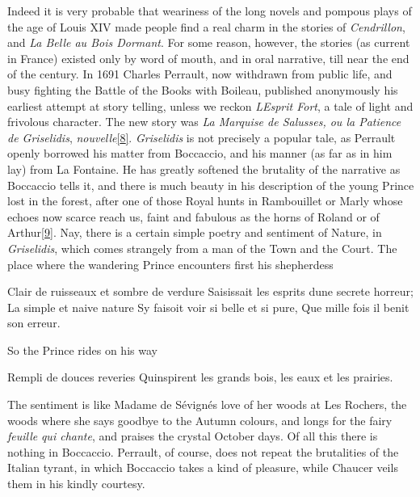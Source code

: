 \documentclass[14pt,a4paper]{memoir}
\begin{document}
Indeed it is very probable that weariness of the long novels and pompous
plays of the age of Louis XIV made people find a real charm in the
stories of \emph{Cendrillon}, and \emph{La Belle au Bois Dormant}. For
some reason, however, the stories (as current in France) existed only by
word of mouth, and in oral narrative, till near the end of the century.
In 1691 Charles Perrault, now withdrawn from public life, and busy
fighting the Battle of the Books with Boileau, published anonymously his
earliest attempt at story telling, unless we reckon
\emph{L\textquotesingle Esprit Fort}, a tale of light and frivolous
character. The new story was \emph{La Marquise de Salusses, ou la
Patience de Griselidis},
\emph{nouvelle}\protect\hypertarget{4533318093929944247_33931-h-0.htm.xhtmlux5cux23FNanchor_8}{}{}\protect\hyperlink{4533318093929944247_33931-h-0.htm.xhtmlux5cux23Footnote_8}{{[}8{]}}.
\emph{Griselidis} is not precisely a popular tale, as Perrault openly
borrowed his matter from Boccaccio, and his manner (as far as in him
lay) from La Fontaine. He has greatly softened the brutality of the
narrative as Boccaccio tells it, and there is much beauty in his
description of the young Prince lost in the forest, after one of those
Royal hunts in Rambouillet or Marly whose echoes now scarce reach us,
faint and fabulous as the horns of Roland or of
Arthur\protect\hypertarget{4533318093929944247_33931-h-0.htm.xhtmlux5cux23FNanchor_9}{}{}\protect\hyperlink{4533318093929944247_33931-h-0.htm.xhtmlux5cux23Footnote_9}{{[}9{]}}.
Nay, there is a certain simple poetry and sentiment of Nature, in
\emph{Griselidis}, which comes strangely from a man of the Town and the
Court. The place where the wandering Prince encounters first his
shepherdess

{\textquotesingle Clair de ruisseaux et sombre de verdure} {Saisissait
les esprits d\textquotesingle une secrete horreur;} {La simple et naive
nature} { S\textquotesingle y faisoit voir si belle et si pure,} {Que
mille fois il benit son erreur.\textquotesingle{}}

So the Prince rides on his way

{\textquotesingle Rempli de douces reveries}
{Qu\textquotesingle inspirent les grands bois, les eaux et les
prairies.\textquotesingle{}}

The sentiment is like Madame de Sévigné\textquotesingle s love of her
woods at Les Rochers, the woods where she says goodbye to the Autumn
colours, and longs for the fairy \emph{feuille} \emph{qui chante}, and
praises \textquotesingle the crystal October days.\textquotesingle{} Of
all this there is nothing in Boccaccio. Perrault, of course, does not
repeat the brutalities of the Italian tyrant, in which Boccaccio takes a
kind of pleasure, while Chaucer veils them in his kindly courtesy.
\end{document}
